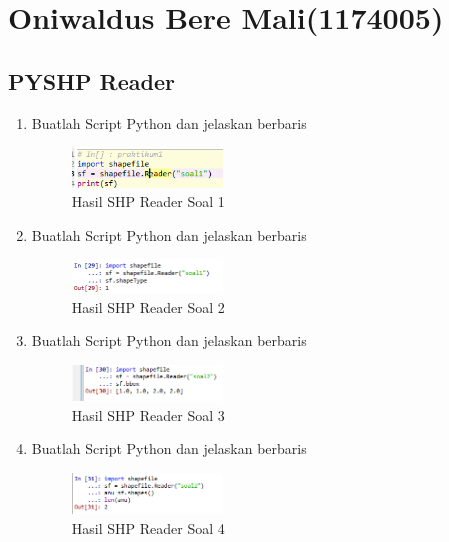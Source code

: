 \section{Oniwaldus Bere Mali(1174005)}
\subsection{PYSHP Reader}
\begin{enumerate}
    \item Buatlah Script Python dan jelaskan berbaris
    
    \hfill\break
    \begin{figure}[H]
		\includegraphics[width=4cm]{figures/1174005/3/01.png}
		\centering
		\caption{Hasil SHP Reader Soal 1}
    \end{figure}
   
    \item Buatlah Script Python dan jelaskan berbaris
    
    \hfill\break
    \begin{figure}[H]
		\includegraphics[width=4cm]{figures/1174005/3/02.png}
		\centering
		\caption{Hasil SHP Reader Soal 2}
    \end{figure}
    
    \item Buatlah Script Python dan jelaskan berbaris
    
    \hfill\break
    \begin{figure}[H]
		\includegraphics[width=4cm]{figures/1174005/3/03.png}
		\centering
		\caption{Hasil SHP Reader Soal 3}
    \end{figure}
    
    \item Buatlah Script Python dan jelaskan berbaris
    
    \hfill\break
    \begin{figure}[H]
		\includegraphics[width=4cm]{figures/1174005/3/04.png}
		\centering
		\caption{Hasil SHP Reader Soal 4}
    \end{figure}
    

\end{enumerate}
